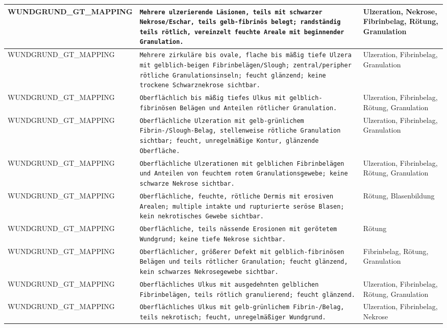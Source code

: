 \begin{longtable}{|p{3.5cm}|p{5cm}|p{6.5cm}|}
WUNDGRUND\_GT\_MAPPING & \texttt{Mehrere ulzerierende Läsionen, teils mit schwarzer Nekrose/Eschar, teils gelb-fibrinös belegt; randständig teils rötlich, vereinzelt feuchte Areale mit beginnender Granulation.} & Ulzeration, Nekrose, Fibrinbelag, Rötung, Granulation \\ \hline
WUNDGRUND\_GT\_MAPPING & \texttt{Mehrere zirkuläre bis ovale, flache bis mäßig tiefe Ulzera mit gelblich-beigen Fibrinbelägen/Slough; zentral/peripher rötliche Granulationsinseln; feucht glänzend; keine trockene Schwarznekrose sichtbar.} & Ulzeration, Fibrinbelag, Granulation \\ \hline
WUNDGRUND\_GT\_MAPPING & \texttt{Oberflächlich bis mäßig tiefes Ulkus mit gelblich-fibrinösen Belägen und Anteilen rötlicher Granulation.} & Ulzeration, Fibrinbelag, Rötung, Granulation \\ \hline
WUNDGRUND\_GT\_MAPPING & \texttt{Oberflächliche Ulzeration mit gelb-grünlichem Fibrin-/Slough-Belag, stellenweise rötliche Granulation sichtbar; feucht, unregelmäßige Kontur, glänzende Oberfläche.} & Ulzeration, Fibrinbelag, Granulation \\ \hline
WUNDGRUND\_GT\_MAPPING & \texttt{Oberflächliche Ulzerationen mit gelblichen Fibrinbelägen und Anteilen von feuchtem rotem Granulationsgewebe; keine schwarze Nekrose sichtbar.} & Ulzeration, Fibrinbelag, Rötung, Granulation \\ \hline
WUNDGRUND\_GT\_MAPPING & \texttt{Oberflächliche, feuchte, rötliche Dermis mit erosiven Arealen; multiple intakte und rupturierte seröse Blasen; kein nekrotisches Gewebe sichtbar.} & Rötung, Blasenbildung \\ \hline
WUNDGRUND\_GT\_MAPPING & \texttt{Oberflächliche, teils nässende Erosionen mit gerötetem Wundgrund; keine tiefe Nekrose sichtbar.} & Rötung \\ \hline
WUNDGRUND\_GT\_MAPPING & \texttt{Oberflächlicher, größerer Defekt mit gelblich-fibrinösen Belägen und teils rötlicher Granulation; feucht glänzend, kein schwarzes Nekrosegewebe sichtbar.} & Fibrinbelag, Rötung, Granulation \\ \hline
WUNDGRUND\_GT\_MAPPING & \texttt{Oberflächliches Ulkus mit ausgedehnten gelblichen Fibrinbelägen, teils rötlich granulierend; feucht glänzend.} & Ulzeration, Fibrinbelag, Rötung, Granulation \\ \hline
WUNDGRUND\_GT\_MAPPING & \texttt{Oberflächliches Ulkus mit gelb-grünlichem Fibrin-/Belag, teils nekrotisch; feucht, unregelmäßiger Wundgrund.} & Ulzeration, Fibrinbelag, Nekrose \\ \hline

\end{longtable}
